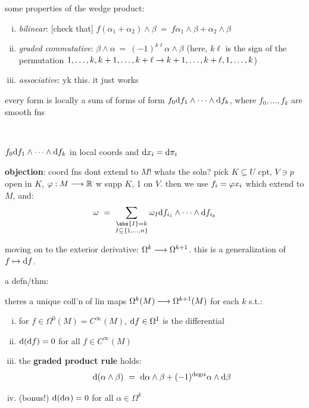 some properties of the wedge product:
\begin{enumerate}[i)]
	\item \textit{bilinear}: [check that]
		$f(\alpha_{1}+\alpha_{2})\wedge\beta \ = \ f\alpha_{1}\wedge\beta+\alpha_{2}\wedge\beta$
	\item \textit{graded commutative}:
		$\beta\wedge\alpha \ = \ (-1)^{k\ell}\alpha\wedge\beta$
		(here, $k\ell$ is the sign of the permutation $1,\dots,k,k+1,\dots,k+\ell\rightarrow k+1,\dots,k+\ell,1,\dots,k$)
	\item \textit{associative}:
		yk this. it just works
\end{enumerate}

\begin{crll}
	every form is locally a sum of forms of form
	$f_{0}\textrm{d} f_{1}\wedge\cdots\wedge\textrm{d} f_{k}$,
	where $f_{0},\dots,f_{k}$ are smooth fns
\end{crll} \

\begin{pf}
	$f_{0}\textrm{d} f_{1}\wedge\cdots\wedge\textrm{d} f_{k}$ in local coords
	and $\textrm{d} x_{i}=\textrm{d}\pi_{i}$
\end{pf}

\textbf{objection}: coord fns dont extend to $M$! whats the soln?
pick $K\subseteq U$ cpt, $V\ni p$ open in $K$, $\varphi:M\longrightarrow\mathbb{R}$ w supp $K$, 1 on $V$.
then we use $f_{i}=\varphi x_{i}$ which extend to $M$, and:
\begin{equation*}
	\omega \ = \ \sum_{\substack{\abs{I}=k \\ I\subseteq\set{1,\dots,n}}}
	\omega_{I}\d f_{i_{1}}\wedge\cdots\wedge\d f_{i_{k}}
\end{equation*}

moving on to the exterior derivative: $\Omega^{k}\longrightarrow\Omega^{k+1}$.
this is a generalization of $f\mapsto\textrm{d} f$.

a defn/thm:
\begin{thm}
	theres a unique coll'n of lin maps $\Omega^{k}(M)\longrightarrow\Omega^{k+1}(M)$
	for each $k$ s.t.:
	\begin{enumerate}[i)]
		\item for $f\in\Omega^{0}(M)=C^{\infty}(M)$, $\textrm{d} f\in\Omega^{1}$ is the differential
		\item $\textrm{d}(\textrm{d} f)=0$ for all $f\in C^{\infty}(M)$
		\item the \textbf{graded product rule} holds:
			\begin{equation*}
				\d(\alpha\wedge\beta) \ = \ \d\alpha\wedge\beta+(-1)^{\trm{deg}\alpha}\alpha\wedge\d\beta
			\end{equation*}
		\item (bonus!) $\textrm{d}(\textrm{d}\alpha)=0$ for all $\alpha\in\Omega^{k}$
	\end{enumerate}
\end{thm}


